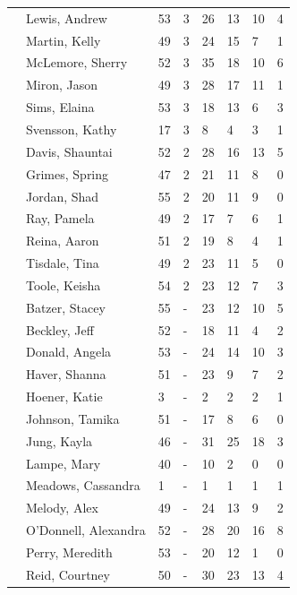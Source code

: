 \documentclass{article}\usepackage[]{graphicx}\usepackage[]{color}
\begin{document}
{\begin{longtable} { >{\raggedright}p{}p{}p{}p{}p{}p{}p{}p{}}
   \rowcolor[gray]{0.90} & Lewis, Andrew & 53 & 3 & 26 & 13 & 10 & 4 \\ 
   \rowcolor[gray]{0.90} & Martin, Kelly & 49 & 3 & 24 & 15 & 7 & 1 \\ 
   \rowcolor[gray]{0.90} & McLemore, Sherry & 52 & 3 & 35 & 18 & 10 & 6 \\ 
   & Miron, Jason & 49 & 3 & 28 & 17 & 11 & 1 \\ 
   & Sims, Elaina & 53 & 3 & 18 & 13 & 6 & 3 \\ 
   & Svensson, Kathy & 17 & 3 & 8 & 4 & 3 & 1 \\ 
   \rowcolor[gray]{0.90} & Davis, Shauntai & 52 & 2 & 28 & 16 & 13 & 5 \\ 
   \rowcolor[gray]{0.90} & Grimes, Spring & 47 & 2 & 21 & 11 & 8 & 0 \\ 
   \rowcolor[gray]{0.90} & Jordan, Shad & 55 & 2 & 20 & 11 & 9 & 0 \\ 
   & Ray, Pamela & 49 & 2 & 17 & 7 & 6 & 1 \\ 
   & Reina, Aaron & 51 & 2 & 19 & 8 & 4 & 1 \\ 
   & Tisdale, Tina & 49 & 2 & 23 & 11 & 5 & 0 \\ 
   \rowcolor[gray]{0.90} & Toole, Keisha & 54 & 2 & 23 & 12 & 7 & 3 \\ 
   \rowcolor[gray]{0.90} & Batzer, Stacey & 55 & - & 23 & 12 & 10 & 5 \\ 
   \rowcolor[gray]{0.90} & Beckley, Jeff & 52 & - & 18 & 11 & 4 & 2 \\ 
   & Donald, Angela & 53 & - & 24 & 14 & 10 & 3 \\ 
   & Haver, Shanna & 51 & - & 23 & 9 & 7 & 2 \\ 
   & Hoener, Katie & 3 & - & 2 & 2 & 2 & 1 \\ 
   \rowcolor[gray]{0.90} & Johnson, Tamika & 51 & - & 17 & 8 & 6 & 0 \\ 
   \rowcolor[gray]{0.90} & Jung, Kayla & 46 & - & 31 & 25 & 18 & 3 \\ 
   \rowcolor[gray]{0.90} & Lampe, Mary & 40 & - & 10 & 2 & 0 & 0 \\ 
   & Meadows, Cassandra & 1 & - & 1 & 1 & 1 & 1 \\ 
   & Melody, Alex & 49 & - & 24 & 13 & 9 & 2 \\ 
   & O'Donnell, Alexandra & 52 & - & 28 & 20 & 16 & 8 \\ 
   \rowcolor[gray]{0.90} & Perry, Meredith & 53 & - & 20 & 12 & 1 & 0 \\ 
   \rowcolor[gray]{0.90} & Reid, Courtney & 50 & - & 30 & 23 & 13 & 4 \\ 

\end{longtable}}
\end{document}
